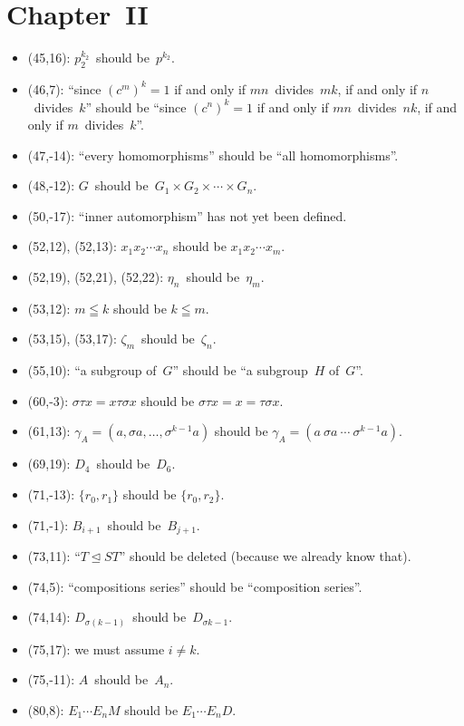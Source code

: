 \documentclass[letterpaper,12pt]{article}
\newcommand{\normal}{\trianglelefteq}
\begin{document}
\section*{Chapter~II}
\begin{itemize}
\item (45,16): \(p_2^{k_2}\)~should be~\(p^{k_2}\).
\item (46,7): ``since \((c^m)^k=1\) if and only if \(mn\)~divides~\(mk\), if and only if \(n\)~divides~\(k\)'' should be ``since \((c^n)^k=1\) if and only if \(mn\)~divides~\(nk\), if and only if \(m\)~divides~\(k\)''.
\item (47,-14): ``every homomorphisms'' should be ``all homomorphisms''.
\item (48,-12): \(G\)~should be~\(G_1\times G_2\times\cdots\times G_n\).
\item (50,-17): ``inner automorphism'' has not yet been defined.
\item (52,12), (52,13): \(x_1x_2\cdots x_n\) should be \(x_1x_2\cdots x_m\).
\item (52,19), (52,21), (52,22): \(\eta_n\)~should be~\(\eta_m\).
\item (53,12): \(m\leqq k\) should be \(k\leqq m\).
\item (53,15), (53,17): \(\zeta_m\)~should be~\(\zeta_n\).
\item (55,10): ``a subgroup of~\(G\)'' should be ``a subgroup~\(H\) of~\(G\)''.
\item (60,-3): \(\sigma\tau x=x\tau\sigma x\) should be \(\sigma\tau x=x=\tau\sigma x\).
\item (61,13): \(\gamma_A=(a,\sigma a,\ldots,\sigma^{k-1}a)\) should be \(\gamma_A=(a\ \sigma a\ \cdots\ \sigma^{k-1}a)\).
\item (69,19): \(D_4\)~should be~\(D_6\).
\item (71,-13): \(\{r_0,r_1\}\) should be \(\{r_0,r_2\}\).
\item (71,-1): \(B_{i+1}\)~should be~\(B_{j+1}\).
\item (73,11): ``\(T\normal ST\)'' should be deleted (because we already know that).
\item (74,5): ``compositions series'' should be ``composition series''.
\item (74,14): \(D_{\sigma(k-1)}\)~should be~\(D_{\sigma k-1}\).
\item (75,17): we must assume \(i\ne k\).
\item (75,-11): \(A\)~should be~\(A_n\).
\item (80,8): \(E_1\cdots E_nM\) should be \(E_1\cdots E_n D\).

\end{itemize}
\end{document}
